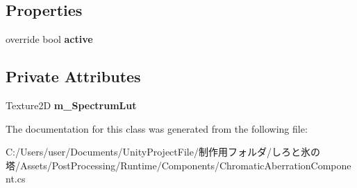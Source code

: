 \subsection*{Properties}
\begin{DoxyCompactItemize}
\item 
\mbox{\label{class_unity_engine_1_1_post_processing_1_1_chromatic_aberration_component_ab1fb32c83cea3eb44e199fe7b6fb05e5}} 
override bool {\bfseries active}
\end{DoxyCompactItemize}
\subsection*{Private Attributes}
\begin{DoxyCompactItemize}
\item 
\mbox{\label{class_unity_engine_1_1_post_processing_1_1_chromatic_aberration_component_a019440c838f5a050e8beae41b5ea2d0c}} 
Texture2D {\bfseries m\+\_\+\+Spectrum\+Lut}
\end{DoxyCompactItemize}


The documentation for this class was generated from the following file\+:\begin{DoxyCompactItemize}
\item 
C\+:/\+Users/user/\+Documents/\+Unity\+Project\+File/制作用フォルダ/しろと氷の塔/\+Assets/\+Post\+Processing/\+Runtime/\+Components/Chromatic\+Aberration\+Component.\+cs\end{DoxyCompactItemize}
